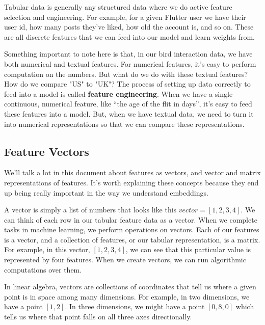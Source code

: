 \documentclass[11pt]{diazessay} %
\begin{document}
Tabular data is generally any structured data where we do active feature selection and engineering. For example, for a given Flutter user we have their user id, how many posts they've liked, how old the account is, and so on. These are all discrete features that we can feed into our model and learn weights from. 

Something important to note here is that, in our bird interaction data, we have both numerical and textual features. For numerical features, it's easy to perform computation on the numbers. But what do we do with these textual features? How do we compare "US" to "UK"? The process of setting up data correctly to feed into a model is called \textbf{feature engineering}. When we have a single continuous, numerical feature, like “the age of the flit in days”, it’s easy to feed these features into a model. But, when we have textual data, we need to turn it into numerical representations so that we can compare these representations.  

\subsection{Feature Vectors}
We'll talk a lot in this document about features as vectors, and vector and matrix representations of features. It's worth explaining these concepts because they end up being really important in the way we understand embeddings. 

A vector is simply a list of numbers that looks like this $vector = [1,2,3,4]$. We can think of each row in our tabular feature data as a vector.  When we complete tasks in machine learning, we perform operations on vectors. Each of our features is a vector, and a collection of features, or our tabular representation, is a matrix. For example, in this vector, $[1,2,3,4]$, we can see that this particular value is represented by four features. When we create vectors, we can run algorithmic computations over them. 

In linear algebra, vectors are collections of coordinates that tell us where a given point is in space among many dimensions. For example, in two dimensions, we have a point $[1,2]$. In three dimensions, we might have a point $[0,8,0]$ which tells us where that point falls on all three axes directionally. 
\end{document}
